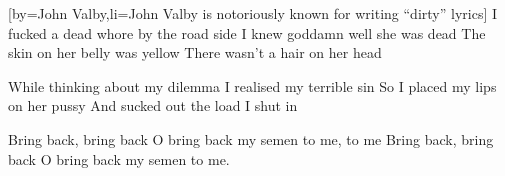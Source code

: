 [by={John Valby},li={John Valby is notoriously known for writing ``dirty'' lyrics}]
\beginverse
I fucked a dead whore by the road side
I knew goddamn well she was dead
The skin on her belly was yellow
There wasn't a hair on her head
\endverse

\beginverse
While thinking about my dilemma
I realised my terrible sin
So I placed my lips on her pussy
And sucked out the load I shut in
\endverse

\beginchorus
Bring back, bring back
O bring back my semen to me, to me
Bring back, bring back
O bring back my semen to me.
\endchorus
\endsong
